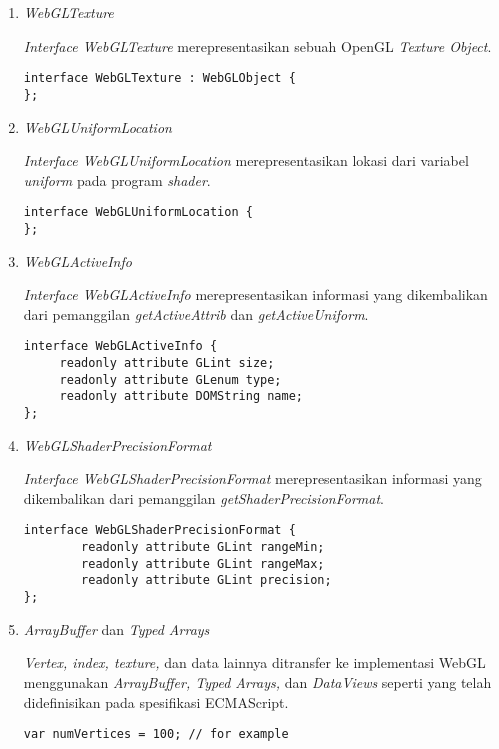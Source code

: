 \begin{enumerate}
\item {\it WebGLTexture}

	{\it Interface WebGLTexture} merepresentasikan sebuah OpenGL {\it Texture Object}.
	\begin{lstlisting}[caption={{\it Texture Object} pada OpenGL.}, captionpos=b]
interface WebGLTexture : WebGLObject {
};
	\end{lstlisting}
	
\item {\it WebGLUniformLocation}

	{\it Interface WebGLUniformLocation} merepresentasikan lokasi dari variabel {\it uniform} pada program {\it shader}.
	\begin{lstlisting}[caption={Lokasi dari variabel {\it uniform}.}, captionpos=b]
interface WebGLUniformLocation {
};
	\end{lstlisting}
	
\item {\it WebGLActiveInfo}

	{\it Interface WebGLActiveInfo} merepresentasikan informasi yang dikembalikan dari pemanggilan {\it getActiveAttrib} dan {\it getActiveUniform}.
	\begin{lstlisting}[caption={Keluaran dari  pemanggilan {\it getActiveAttrib} dan {\it getActiveUniform}.}, captionpos=b]
interface WebGLActiveInfo {
  	 readonly attribute GLint size;
   	 readonly attribute GLenum type;
	 readonly attribute DOMString name;
};
	\end{lstlisting}
	
\item {\it WebGLShaderPrecisionFormat}

	{\it Interface WebGLShaderPrecisionFormat} merepresentasikan informasi yang dikembalikan dari pemanggilan {\it getShaderPrecisionFormat}.
	\begin{lstlisting}[caption={Keluaran dari  pemanggilan {\it getShaderPrecisionFormat}.}, captionpos=b]
interface WebGLShaderPrecisionFormat {
    	readonly attribute GLint rangeMin;
    	readonly attribute GLint rangeMax;
    	readonly attribute GLint precision;
};
	\end{lstlisting}
	
\item {\it ArrayBuffer} dan {\it Typed Arrays}

	{\it Vertex, index, texture,} dan data lainnya ditransfer ke implementasi WebGL menggunakan {\it ArrayBuffer, Typed Arrays,} dan {\it DataViews} seperti yang telah didefinisikan pada spesifikasi ECMAScript.
\begin{lstlisting}[caption={Transfer data ke implementasi WebGL.}, captionpos=b]
var numVertices = 100; // for example


\end{lstlisting}
\end{enumerate}
